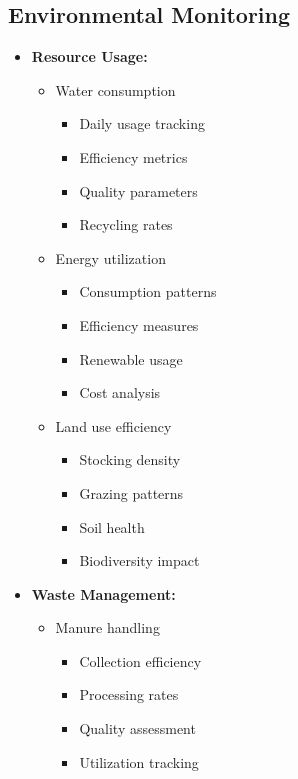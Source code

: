 \subsection{Environmental Monitoring}
\begin{itemize}
    \item \textbf{Resource Usage:}
    \begin{itemize}
        \item Water consumption
        \begin{itemize}
            \item Daily usage tracking
            \item Efficiency metrics
            \item Quality parameters
            \item Recycling rates
        \end{itemize}
        
        \item Energy utilization
        \begin{itemize}
            \item Consumption patterns
            \item Efficiency measures
            \item Renewable usage
            \item Cost analysis
        \end{itemize}
        
        \item Land use efficiency
        \begin{itemize}
            \item Stocking density
            \item Grazing patterns
            \item Soil health
            \item Biodiversity impact
        \end{itemize}
    \end{itemize}
    
    \item \textbf{Waste Management:}
    \begin{itemize}
        \item Manure handling
        \begin{itemize}
            \item Collection efficiency
            \item Processing rates
            \item Quality assessment
            \item Utilization tracking
        \end{itemize}
        

\end{itemize}
\end{itemize}
